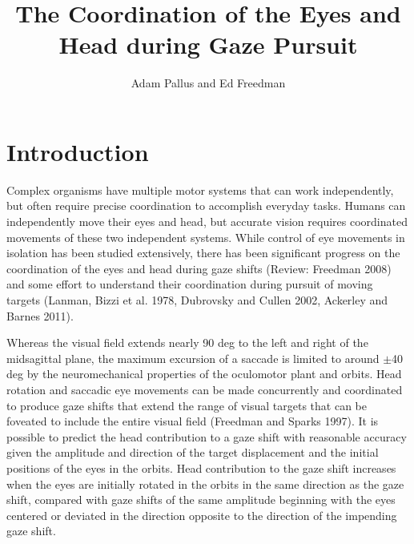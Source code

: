 \documentclass[12pt]{article}
\title{The Coordination of the Eyes and Head during Gaze Pursuit}
\author{Adam Pallus and Ed Freedman}
\begin{document}
\date{}
\maketitle

\begin{abstract}

\end{abstract}

\section{Introduction}
Complex organisms have multiple motor systems that can work independently, but often require precise coordination to accomplish everyday tasks. Humans can independently move their eyes and head, but accurate vision requires coordinated movements of these two independent systems. While control of eye movements in isolation has been studied extensively, there has been significant progress on the coordination of the eyes and head during gaze shifts (Review: Freedman 2008) and some effort to understand their coordination during pursuit of moving targets (Lanman, Bizzi et al. 1978, Dubrovsky and Cullen 2002, Ackerley and Barnes 2011).

Whereas the visual field extends nearly 90 deg to the left and right of the midsagittal plane, the maximum excursion of a saccade is limited to around $\pm$40 deg by the neuromechanical properties of the oculomotor plant and orbits. Head rotation and saccadic eye movements can be made concurrently and coordinated to produce gaze shifts that extend the range of visual targets that can be foveated to include the entire visual field (Freedman and Sparks 1997). It is possible to predict the head contribution to a gaze shift with reasonable accuracy given the amplitude and direction of the target displacement and the initial positions of the eyes in the orbits. Head contribution to the gaze shift increases when the eyes are initially rotated in the orbits in the same direction as the gaze shift, compared with gaze shifts of the same amplitude beginning with the eyes centered or deviated in the direction opposite to the direction of the impending gaze shift.
\end{document}

